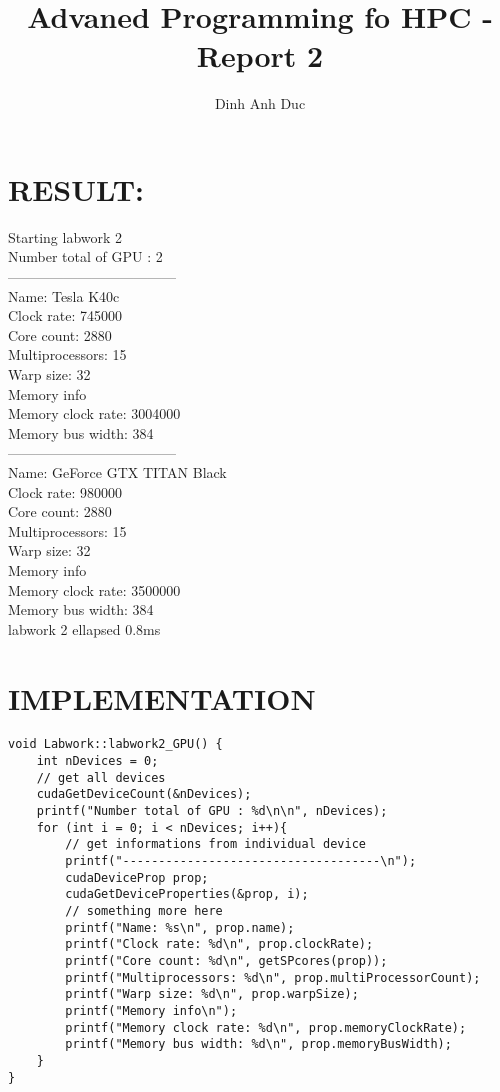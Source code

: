 \documentclass{article}
\title{Advaned Programming fo HPC - Report 2}
\author{Dinh Anh Duc}
\begin{document}
\maketitle

\section*{RESULT:}
Starting labwork 2
\\
Number total of GPU : 2
\\
------------------------------------
\\
Name: Tesla K40c
\\
Clock rate: 745000
\\
Core count: 2880
\\
Multiprocessors: 15
\\
Warp size: 32
\\
Memory info
\\
Memory clock rate: 3004000
\\
Memory bus width: 384
\\
------------------------------------
\\
Name: GeForce GTX TITAN Black
\\
Clock rate: 980000
\\
Core count: 2880
\\
Multiprocessors: 15
\\
Warp size: 32
\\
Memory info
\\
Memory clock rate: 3500000
\\
Memory bus width: 384
\\
labwork 2 ellapsed 0.8ms
\\
\section*{IMPLEMENTATION}
\begin{lstlisting}
void Labwork::labwork2_GPU() {
    int nDevices = 0;
    // get all devices
    cudaGetDeviceCount(&nDevices);
    printf("Number total of GPU : %d\n\n", nDevices);
    for (int i = 0; i < nDevices; i++){
        // get informations from individual device
        printf("------------------------------------\n");
        cudaDeviceProp prop;
        cudaGetDeviceProperties(&prop, i);
        // something more here
        printf("Name: %s\n", prop.name);
        printf("Clock rate: %d\n", prop.clockRate);
        printf("Core count: %d\n", getSPcores(prop));
        printf("Multiprocessors: %d\n", prop.multiProcessorCount);
        printf("Warp size: %d\n", prop.warpSize);
        printf("Memory info\n");
        printf("Memory clock rate: %d\n", prop.memoryClockRate);
        printf("Memory bus width: %d\n", prop.memoryBusWidth);
    }
}
\end{lstlisting}
\end{document}

